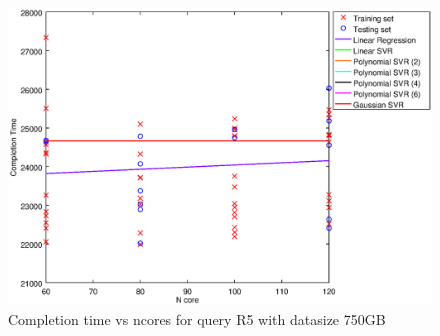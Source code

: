 
\begin {figure}[hbtp]
\centering
\includegraphics[width=\textwidth]{output/R5_750_ONLY_1_LINEAR_NCORE/plot_R5_750.eps}
\caption{Completion time vs ncores for query R5 with datasize 750GB}
\label{fig:only_1_linear_R5_750}
\end {figure}
